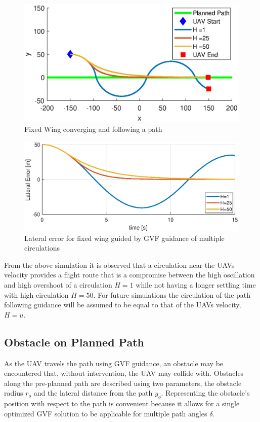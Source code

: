 \documentclass[numbered,pdftex]{ohio-etd}
\begin{document}
\begin{figure}[H]
	\centering
	\includegraphics[trim=0 30 0 65,clip,width=14cm]{PaperFigures/Methods/pathMultipleHs}
	\caption{Fixed Wing converging and following a path}
	\label{fig:uavPathMultipleHs}
\end{figure}


\begin{figure}[H]
	\centering
	\includegraphics[trim=0 0 0 0,clip,width=16cm]{PaperFigures/Methods/lateralErrorVsTime}
	\caption{Lateral error for fixed wing guided by GVF guidance of multiple circulations}
	\label{fig:uavPathMultipleHsLateral}
\end{figure}

From the above simulation it is observed that a circulation near the UAVs velocity provides a flight route that is a compromise between the high oscillation and high overshoot of a circulation $H=1$ while not having a longer settling time with high circulation $H=50$. For future simulations the circulation of the path following guidance will be assumed to be equal to that of the UAVs velocity, $H=u$. \\

\subsection{Obstacle on Planned Path}
As the UAV travels the path using GVF guidance, an obstacle may be encountered that, without intervention, the UAV may collide with. Obstacles along the pre-planned path are described using two parameters, the obstacle radius $r_o$ and the lateral distance from the path $y_o$. Representing the obstacle's position with respect to the path is convenient because it allows for a single optimized GVF solution to be applicable for multiple path angles $\delta$.
\end{document}

